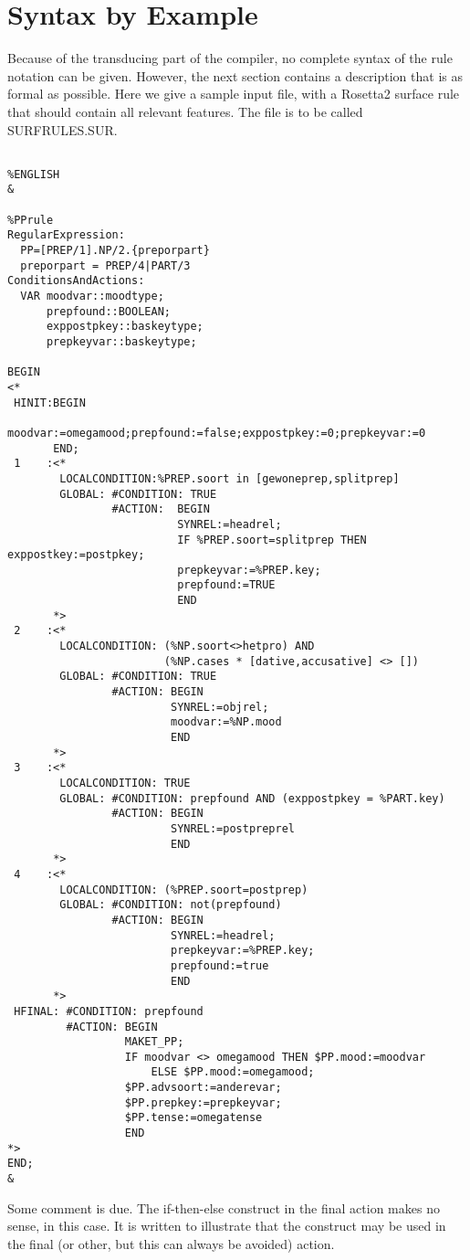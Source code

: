\section{Syntax by Example}
Because of the transducing part of the compiler, no complete syntax of the
rule notation can be given. However, the next section contains a description
that is as formal as possible. Here we give a sample input file, with a
Rosetta2 surface rule that should contain all relevant features. The file is
to be called SURFRULES.SUR.
\begin{verbatim}

%ENGLISH
&

%PPrule
RegularExpression:
  PP=[PREP/1].NP/2.{preporpart}
  preporpart = PREP/4|PART/3
ConditionsAndActions:
  VAR moodvar::moodtype;
      prepfound::BOOLEAN;
      exppostpkey::baskeytype;
      prepkeyvar::baskeytype;

BEGIN
<*
 HINIT:BEGIN
         moodvar:=omegamood;prepfound:=false;exppostpkey:=0;prepkeyvar:=0
       END;
 1    :<*
        LOCALCONDITION:%PREP.soort in [gewoneprep,splitprep]
        GLOBAL: #CONDITION: TRUE
                #ACTION:  BEGIN
                          SYNREL:=headrel;
                          IF %PREP.soort=splitprep THEN exppostkey:=postpkey;
                          prepkeyvar:=%PREP.key;
                          prepfound:=TRUE
                          END
       *>
 2    :<*
        LOCALCONDITION: (%NP.soort<>hetpro) AND
                        (%NP.cases * [dative,accusative] <> [])
        GLOBAL: #CONDITION: TRUE
                #ACTION: BEGIN
                         SYNREL:=objrel;
                         moodvar:=%NP.mood
                         END
       *>
 3    :<*
        LOCALCONDITION: TRUE
        GLOBAL: #CONDITION: prepfound AND (exppostpkey = %PART.key)
                #ACTION: BEGIN
                         SYNREL:=postpreprel
                         END
       *>
 4    :<*
        LOCALCONDITION: (%PREP.soort=postprep)
        GLOBAL: #CONDITION: not(prepfound)
                #ACTION: BEGIN
                         SYNREL:=headrel;
                         prepkeyvar:=%PREP.key;
                         prepfound:=true
                         END
       *>
 HFINAL: #CONDITION: prepfound
         #ACTION: BEGIN
                  MAKET_PP;
                  IF moodvar <> omegamood THEN $PP.mood:=moodvar
                      ELSE $PP.mood:=omegamood;
                  $PP.advsoort:=anderevar;
                  $PP.prepkey:=prepkeyvar;
                  $PP.tense:=omegatense
                  END
*>
END;
&
\end{verbatim}
Some comment is due. The if-then-else construct in the final action makes
no sense, in this case. It is written to illustrate that the construct may
be used in the final (or other, but this can always be avoided) action.

